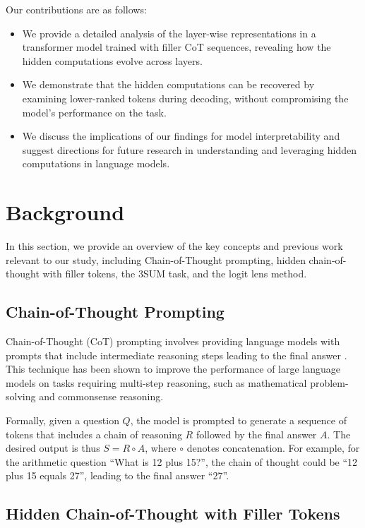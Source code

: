 \documentclass{article}
\begin{document}
Our contributions are as follows:

\begin{itemize}
    \item We provide a detailed analysis of the layer-wise representations in a transformer model trained with filler CoT sequences, revealing how the hidden computations evolve across layers.
    \item We demonstrate that the hidden computations can be recovered by examining lower-ranked tokens during decoding, without compromising the model's performance on the task.
    \item We discuss the implications of our findings for model interpretability and suggest directions for future research in understanding and leveraging hidden computations in language models.
\end{itemize}

\section{Background}

In this section, we provide an overview of the key concepts and previous work relevant to our study, including Chain-of-Thought prompting, hidden chain-of-thought with filler tokens, the 3SUM task, and the logit lens method.

\subsection{Chain-of-Thought Prompting}

Chain-of-Thought (CoT) prompting involves providing language models with prompts that include intermediate reasoning steps leading to the final answer \cite{wei2022chain}. This technique has been shown to improve the performance of large language models on tasks requiring multi-step reasoning, such as mathematical problem-solving and commonsense reasoning.

Formally, given a question $Q$, the model is prompted to generate a sequence of tokens that includes a chain of reasoning $R$ followed by the final answer $A$. The desired output is thus $S = R \circ A$, where $\circ$ denotes concatenation. For example, for the arithmetic question ``What is 12 plus 15?'', the chain of thought could be ``12 plus 15 equals 27'', leading to the final answer ``27''.

\subsection{Hidden Chain-of-Thought with Filler Tokens}
\end{document}
